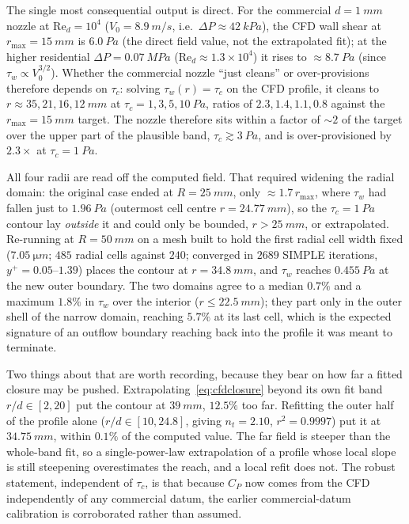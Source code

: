 \documentclass[aps,prfluids,reprint,amsmath,amssymb,floatfix]{revtex4-2}
\newcommand{\Rey}{\mathrm{Re}}
\begin{document}
The single most consequential output is direct. For the commercial
$d = \SI{1}{mm}$ nozzle at $\Rey_d = 10^4$ ($V_0 = \SI{8.9}{m/s}$, i.e.\
$\Delta P \approx \SI{42}{kPa}$), the CFD wall shear at
$r_\mathrm{max} = \SI{15}{mm}$ is $\SI{6.0}{Pa}$ (the direct field value, not
the extrapolated fit); at the higher residential $\Delta P = \SI{0.07}{MPa}$
($\Rey_d \approx 1.3\times10^4$) it rises to $\approx \SI{8.7}{Pa}$
(since $\tau_w \propto V_0^{3/2}$). Whether the commercial nozzle ``just
cleans'' or over-provisions therefore depends on $\tau_c$: solving
$\tau_w(r) = \tau_c$ on the CFD profile, it cleans to
$r \approx 35, 21, 16, \SI{12}{mm}$ at $\tau_c = 1, 3, 5, \SI{10}{Pa}$, ratios
of $2.3, 1.4, 1.1, 0.8$ against the $r_\mathrm{max} = \SI{15}{mm}$ target. The
nozzle therefore sits within a factor of $\sim2$ of the target over the upper
part of the plausible band, $\tau_c \gtrsim \SI{3}{Pa}$, and is over-provisioned
by $2.3\times$ at $\tau_c = \SI{1}{Pa}$.

All four radii are read off the computed field. That required widening the
radial domain: the original case ended at $R = \SI{25}{mm}$, only
$\approx 1.7\,r_\mathrm{max}$, where $\tau_w$ had fallen just to
$\SI{1.96}{Pa}$ (outermost cell centre $r = \SI{24.77}{mm}$), so the
$\tau_c = \SI{1}{Pa}$ contour lay \emph{outside} it and could only be bounded,
$r > \SI{25}{mm}$, or extrapolated. Re-running at $R = \SI{50}{mm}$ on a mesh
built to hold the first radial cell width fixed ($\SI{7.05}{\micro m}$;
$485$ radial cells against $240$; converged in $2689$ SIMPLE iterations,
$y^+ = 0.05$--$1.39$) places the contour at $r = \SI{34.8}{mm}$, and $\tau_w$
reaches $\SI{0.455}{Pa}$ at the new outer boundary. The two domains agree to a
median $0.7\%$ and a maximum $1.8\%$ in $\tau_w$ over the interior
($r \leq \SI{22.5}{mm}$); they part only in the outer shell of the narrow
domain, reaching $5.7\%$ at its last cell, which is the expected signature of an
outflow boundary reaching back into the profile it was meant to terminate.

Two things about that are worth recording, because they bear on how far a fitted
closure may be pushed. Extrapolating~\eqref{eq:cfdclosure} beyond its own fit
band $r/d \in [2,20]$ put the contour at $\SI{39}{mm}$, $12.5\%$ too far.
Refitting the outer half of the profile alone ($r/d \in [10, 24.8]$, giving
$n_t = 2.10$, $r^2 = 0.9997$) put it at $\SI{34.75}{mm}$, within $0.1\%$ of the
computed value. The far field is steeper than the whole-band fit, so a
single-power-law extrapolation of a profile whose local slope is still steepening
overestimates the reach, and a local refit does not. The robust statement, independent of $\tau_c$,
is that because $C_P$ now comes from the CFD independently of any commercial
datum, the earlier commercial-datum calibration is corroborated rather than
assumed.
\end{document}
